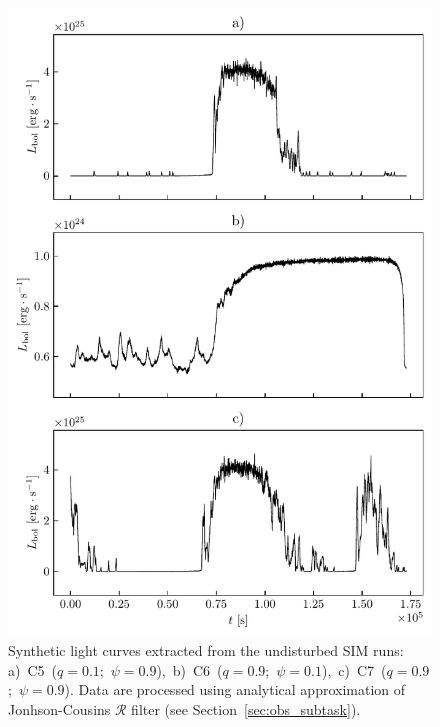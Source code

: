     \begin{figure}
    \begin{center}
        \includegraphics[width=1.0\textwidth]{img/plot_light_curves_disturbed.pdf}
    \end{center}
    \caption{Synthetic light curves extracted from the undisturbed SIM runs: \mbox{a) C5 ($q = 0.1$; $\psi = 0.9$), b) C6 ($q = 0.9$; $\psi = 0.1$), c) C7 ($q = 0.9$; $\psi = 0.9$)}. Data are processed using analytical approximation of Jonhson-Cousins $\mathcal{R}$ filter (see Section~\ref{sec:obs_subtask}).}
    \label{fig:plot_light_curves_disturbed}
    \end{figure}
